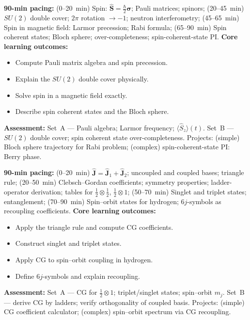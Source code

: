 \documentclass[11pt,a4paper]{article}
\begin{document}
\medskip

\begin{tcolorbox}[modulebox, title={Module~II.3 --- Lecture L04: Spin Angular Momentum}]
\textbf{90-min pacing:} (0--20~min) Spin: $\hat{\mathbf{S}}=\tfrac{\hbar}{2}\hat{\boldsymbol{\sigma}}$; Pauli matrices; spinors; (20--45~min) $SU(2)$ double cover; $2\pi$ rotation $\to-1$; neutron interferometry; (45--65~min) Spin in magnetic field: Larmor precession; Rabi formula; (65--90~min) Spin coherent states; Bloch sphere; over-completeness; spin-coherent-state PI.
\medskip\textbf{Core learning outcomes:}
\begin{itemize}[leftmargin=1.4em,topsep=2pt,itemsep=1pt]
  \item Compute Pauli matrix algebra and spin precession.
  \item Explain the $SU(2)$ double cover physically.
  \item Solve spin in a magnetic field exactly.
  \item Describe spin coherent states and the Bloch sphere.
\end{itemize}
\medskip\textbf{Assessment:}
Set~A --- Pauli algebra; Larmor frequency; $\langle\hat{S}_z\rangle(t)$.
Set~B --- $SU(2)$ double cover; spin coherent state over-completeness.
Projects: (simple) Bloch sphere trajectory for Rabi problem; (complex) spin-coherent-state PI: Berry phase.
\end{tcolorbox}

\medskip

\begin{tcolorbox}[modulebox, title={Module~II.3 --- Lecture L05: Addition of Angular Momenta}]
\textbf{90-min pacing:} (0--20~min) $\hat{\mathbf{J}}=\hat{\mathbf{J}}_1+\hat{\mathbf{J}}_2$; uncoupled and coupled bases; triangle rule; (20--50~min) Clebsch--Gordan coefficients; symmetry properties; ladder-operator derivation; tables for $\tfrac{1}{2}\otimes\tfrac{1}{2}$, $\tfrac{1}{2}\otimes1$; (50--70~min) Singlet and triplet states; entanglement; (70--90~min) Spin--orbit states for hydrogen; $6j$-symbols as recoupling coefficients.
\medskip\textbf{Core learning outcomes:}
\begin{itemize}[leftmargin=1.4em,topsep=2pt,itemsep=1pt]
  \item Apply the triangle rule and compute CG coefficients.
  \item Construct singlet and triplet states.
  \item Apply CG to spin--orbit coupling in hydrogen.
  \item Define $6j$-symbols and explain recoupling.
\end{itemize}
\medskip\textbf{Assessment:}
Set~A --- CG for $\tfrac{1}{2}\otimes1$; triplet/singlet states; spin--orbit $m_j$.
Set~B --- derive CG by ladders; verify orthogonality of coupled basis.
Projects: (simple) CG coefficient calculator; (complex) spin--orbit spectrum via CG recoupling.
\end{tcolorbox}
\end{document}

